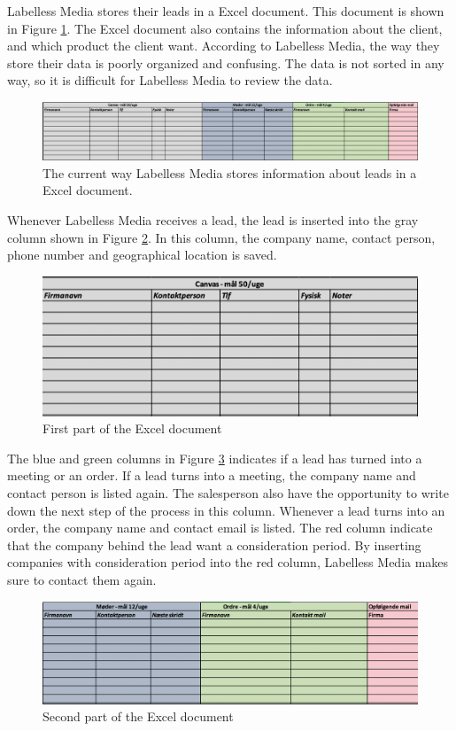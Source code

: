 \noindent
Labelless Media stores their leads in a Excel document. This document is shown in Figure \ref{fig:ExcelDocument}. The Excel document also contains the information about the client, and which product the client want. According to Labelless Media, the way they store their data is poorly organized and confusing. The data is not sorted in any way, so it is difficult for Labelless Media to review the data. 
\begin{figure}[H]
    \centering
    \includegraphics[scale=0.3, clip]{figures/LMExcel.png}
    \caption{The current way Labelless Media stores information about leads in a Excel document.}
    \label{fig:ExcelDocument}
\end{figure}
\noindent
Whenever Labelless Media receives a lead, the lead is inserted into the gray column shown in Figure \ref{fig:ExcelPt1}. In this column, the company name, contact person, phone number and geographical location is saved. 
\begin{figure}[H]
    \centering
    \includegraphics[scale=0.6, clip]{figures/ExcelPt1.png}
    \caption{First part of the Excel document}
    \label{fig:ExcelPt1}
\end{figure}
\noindent
The blue and green columns in Figure \ref{fig:ExcelPt2} indicates if a lead has turned into a meeting or an order. If a lead turns into a meeting, the company name and contact person is listed again. The salesperson also have the opportunity to write down the next step of the process in this column. Whenever a lead turns into an order, the company name and contact email is listed. The red column indicate that the company behind the lead want a consideration period. By inserting companies with consideration period into the red column, Labelless Media makes sure to contact them again.
\begin{figure}[H]
    \centering
    \includegraphics[scale=0.6, clip]{figures/ExcelPt2.png}
    \caption{Second part of the Excel document}
    \label{fig:ExcelPt2}
\end{figure}
\noindent

